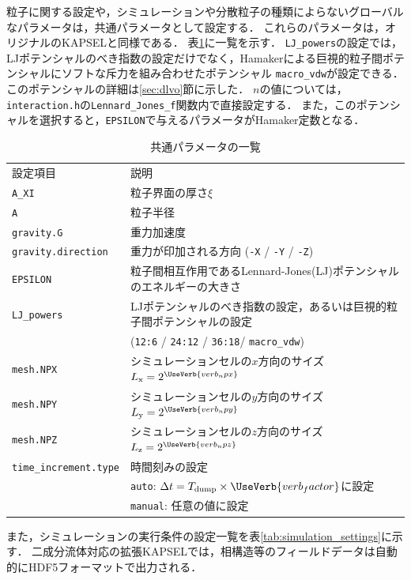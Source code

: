 \documentclass[pdflatex,a4paper,10pt,ja=standard]{bxjsarticle}
\begin{document}
粒子に関する設定や，シミュレーションや分散粒子の種類によらないグローバルなパラメータは，共通パラメータとして設定する．
これらのパラメータは，オリジナルのKAPSELと同様である．
表\ref{tab:global_parameters}に一覧を示す．
\verb|LJ_powers|の設定では，LJポテンシャルのべき指数の設定だけでなく，Hamakerによる巨視的粒子間ポテンシャルにソフトな斥力を組み合わせたポテンシャル \verb|macro_vdw|が設定できる．
このポテンシャルの詳細は\ref{sec:dlvo}節に示した．
$n$の値については，\verb|interaction.h|の\verb|Lennard_Jones_f|関数内で直接設定する．
また，このポテンシャルを選択すると，\verb|EPSILON|で与えるパラメータがHamaker定数となる．

\begin{longtable}{ll}
    \caption{共通パラメータの一覧}\label{tab:global_parameters}\\
    \toprule
    設定項目 & 説明 \\
    \cmidrule(r){1-1}
    \cmidrule(r){2-2}
    \verb|A_XI| & 粒子界面の厚さ$\xi$\\
    \verb|A| & 粒子半径 \\
    \verb|gravity.G| & 重力加速度 \\
    \verb|gravity.direction| & 重力が印加される方向 (\verb|-X| / \verb|-Y| / \verb|-Z|) \\
    \verb|EPSILON| & 粒子間相互作用であるLennard-Jones(LJ)ポテンシャルのエネルギーの大きさ \\
    \verb|LJ_powers| & LJポテンシャルのべき指数の設定，あるいは巨視的粒子間ポテンシャルの設定\\
    & (\verb|12:6| / \verb|24:12| / \verb|36:18|/ \verb|macro_vdw|) \\
    \verb|mesh.NPX| & シミュレーションセルの$x$方向のサイズ $L_{\mathrm x} = 2^{\UseVerb{verb_npx}}$\\
    \verb|mesh.NPY| & シミュレーションセルの$y$方向のサイズ $L_{\mathrm y} = 2^{\UseVerb{verb_npy}}$\\
    \verb|mesh.NPZ| & シミュレーションセルの$z$方向のサイズ $L_{\mathrm z} = 2^{\UseVerb{verb_npz}}$\\
    \verb|time_increment.type| & 時間刻みの設定 \\
    & \verb|auto|: $\Delta t = T_{\mathrm {dump}} \times \UseVerb{verb_factor}$に設定 \\
    & \verb|manual|: 任意の値に設定 \\
    \bottomrule
\end{longtable}

また，シミュレーションの実行条件の設定一覧を表\ref{tab:simulation_settings}に示す．
二成分流体対応の拡張KAPSELでは，相構造等のフィールドデータは自動的にHDF5フォーマットで出力される．
\end{document}
